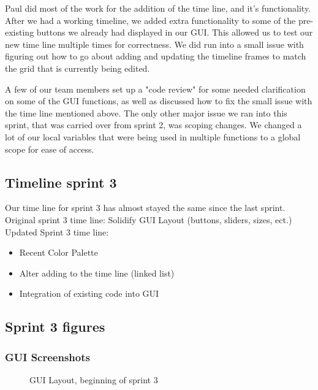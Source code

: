\documentclass[11pt]{article} %
\begin{document}
Paul did most of the work for the addition of the time line, and it's functionality. After we had a working timeline, we added extra functionality to some of the pre-existing buttons we already had displayed in our GUI. This allowed us to test our new time line multiple times for correctness. We did run into a small issue with figuring out how to go about adding and updating the timeline frames to match the grid that is currently being edited.

A few of our team members set up a "code review" for some needed clarification on some of the GUI functions, as well as discussed how to fix the small issue with the time line mentioned above. The only other major issue we ran into this sprint, that was carried over from sprint 2, was scoping changes. We changed a lot of our local variables that were being used in multiple functions to a global scope for ease of access.

\subsection{Timeline sprint 3}
%
Our time line for sprint 3 has almost stayed the same since the last sprint. 
Original sprint 3 time line:
Solidify GUI Layout (buttons, sliders, sizes, ect.)\\

\noindent Updated Sprint 3 time line:
\begin{itemize}
	\item Recent Color Palette
	\item Alter adding to the time line (linked list)
	\item Integration of existing code into GUI
\end{itemize}

\newpage
\subsection{Sprint 3 figures}
\subsubsection{GUI Screenshots}

  \begin{figure}[H]
  	\centering
  	\caption{GUI Layout, beginning of sprint 3}
  	\label{fig:GUI Design Start Sprint 3}
  \end{figure}
  
\end{document}
